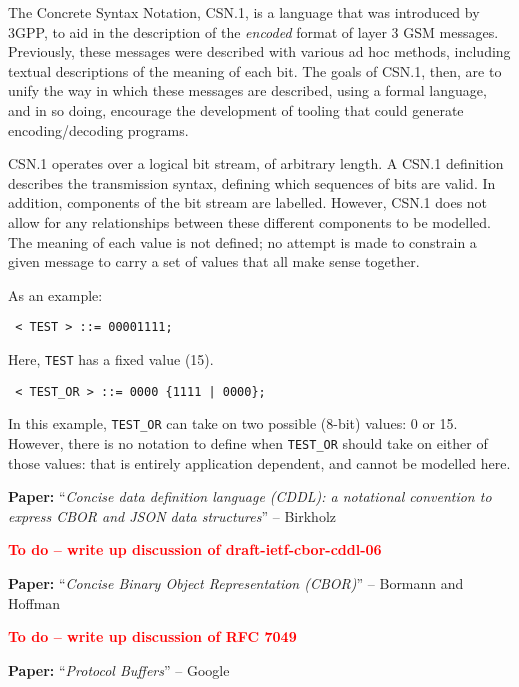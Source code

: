 \documentclass[10pt,a4paper]{article}
\newcommand{\todo}[1]{\textbf{\textcolor{red}{To do -- #1}}}
\newcommand{\paper}[3]{\vspace{4mm}\noindent\textbf{Paper:} ``\textit{#1}'' -- #2 \cite{#3}\vspace{3mm}}
\begin{document}
The Concrete Syntax Notation, CSN.1, is a language that was introduced by 3GPP, to aid in
the description of the \emph{encoded} format of layer 3 GSM messages. Previously, these
messages were described with various ad hoc methods, including textual descriptions of the
meaning of each bit. The goals of CSN.1, then, are to unify the way in which these
messages are described, using a formal language, and in so doing, encourage the
development of tooling that could generate encoding/decoding programs.

CSN.1 operates over a logical bit stream, of arbitrary length. A CSN.1 definition
describes the transmission syntax, defining which sequences of bits are valid. In
addition, components of the bit stream are labelled. However, CSN.1 does not allow for any
relationships between these different components to be modelled. The meaning of each value
is not defined; no attempt is made to constrain a given message to carry a set of values
that all make sense together.

As an example:

\begin{verbatim} < TEST > ::= 00001111; \end{verbatim}

Here, \texttt{TEST} has a fixed value (15).

\begin{verbatim} < TEST_OR > ::= 0000 {1111 | 0000}; \end{verbatim}

In this example, \texttt{TEST\_OR} can take on two possible (8-bit) values: 0 or 15.
However, there is no notation to define when \texttt{TEST\_OR} should take on either of
those values: that is entirely application dependent, and cannot be modelled here.

\paper{Concise data definition language (CDDL): a notational convention to
       express CBOR and JSON data structures}{Birkholz}{draft-ietf-cbor-cddl-06}

\todo{write up discussion of draft-ietf-cbor-cddl-06}

\paper{Concise Binary Object Representation (CBOR)}{Bormann and Hoffman}{rfc7049}

\todo{write up discussion of RFC 7049}

\paper{Protocol Buffers}{Google}{protocol-buffers}
\end{document}
